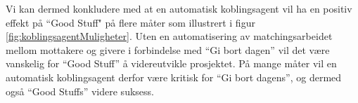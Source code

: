 Vi kan dermed konkludere med at en automatisk koblingsagent vil ha en positiv effekt på ``Good Stuff" på flere måter som illustrert i figur \ref{fig:koblingsagentMuligheter}. Uten en automatisering av matchingsarbeidet mellom mottakere og givere i forbindelse med “Gi bort dagen” vil det være vanskelig for “Good Stuff” å videreutvikle prosjektet. På mange måter vil en automatisk koblingsagent derfor være kritisk for “Gi bort dagens”, og dermed også “Good Stuffs” videre suksess.
